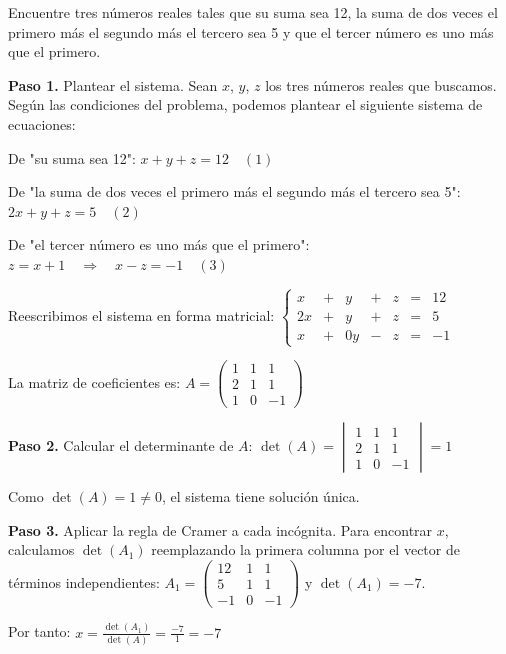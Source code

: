 \begin{example}
Encuentre tres números reales tales que su suma sea 12, la suma de dos veces el primero más el segundo más el tercero sea 5 y que el tercer número es uno más que el primero.
\begin{myproof}
\textbf{Paso 1.} Plantear el sistema. Sean $x$, $y$, $z$ los tres números reales que buscamos. Según las condiciones del problema, podemos plantear el siguiente sistema de ecuaciones:

De "su suma sea 12": $x + y + z = 12 \quad (1)$

De "la suma de dos veces el primero más el segundo más el tercero sea 5": $2x + y + z = 5 \quad (2)$

De "el tercer número es uno más que el primero": $z = x + 1 \quad \Rightarrow \quad x - z = -1 \quad (3)$

Reescribimos el sistema en forma matricial:
$\left\lbrace \begin{array}{ccccccc}
x & + & y & + & z & = & 12 \\
2x & + & y & + & z & = & 5 \\
x & + & 0y & - & z & = & -1
\end{array} \right.$

La matriz de coeficientes es:
$A = \begin{pmatrix}
1 & 1 & 1 \\
2 & 1 & 1 \\
1 & 0 & -1
\end{pmatrix}$

\textbf{Paso 2.} Calcular el determinante de $A$:
$\det(A) = \begin{vmatrix}
1 & 1 & 1 \\
2 & 1 & 1 \\
1 & 0 & -1
\end{vmatrix} = 1$

Como $\det(A) = 1 \neq 0$, el sistema tiene solución única.

\textbf{Paso 3.} Aplicar la regla de Cramer a cada incógnita. Para encontrar $x$, calculamos $\det(A_1)$ reemplazando la primera columna por el vector de términos independientes:
$A_1 = \begin{pmatrix}
12 & 1 & 1 \\
5 & 1 & 1 \\
-1 & 0 & -1
\end{pmatrix}$ y $\det(A_1) = -7.$

Por tanto: $x = \frac{\det(A_1)}{\det(A)} = \frac{-7}{1} = -7$


\end{myproof}
\end{example}
